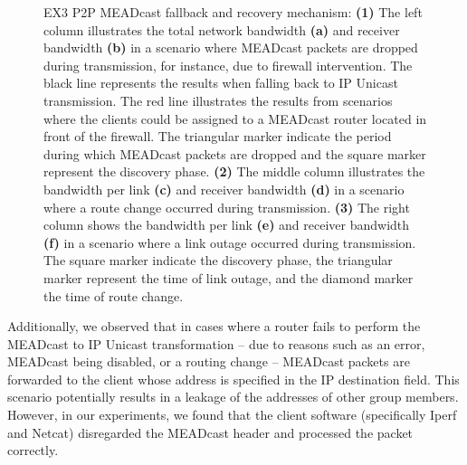 \begin{figure}
    \begin{center}
        
    \end{center}
    \caption[MEADcast fallback and recovery mechanism]{
        EX3 P2P MEADcast fallback and recovery mechanism:
        \textbf{(1)} The left column illustrates the total network bandwidth
            \textbf{(a)} and receiver bandwidth \textbf{(b)} in a scenario
            where MEADcast packets are dropped during transmission, for
            instance, due to firewall intervention.
        The black line represents the results when falling back to IP Unicast
            transmission.
        The red line illustrates the results from scenarios where the clients
            could be assigned to a MEADcast router located in front of the
            firewall.
        The triangular marker indicate the period during which MEADcast packets
            are dropped and the square marker represent the discovery phase.
        \textbf{(2)} The middle column illustrates the bandwidth per link
            \textbf{(c)} and receiver bandwidth \textbf{(d)} in a scenario
            where a route change occurred during transmission.
        \textbf{(3)} The right column  shows the bandwidth per link
            \textbf{(e)} and receiver bandwidth \textbf{(f)} in a scenario
            where a link outage occurred during transmission.
        The square marker indicate the discovery phase, the triangular marker
            represent the time of link outage, and the diamond marker the time 
            of route change.
        }
    \label{fig:dyn_net_env}
\end{figure}

Additionally, we observed that in cases where a router fails to perform the
    MEADcast to IP Unicast transformation -- due to reasons such as an error,
    MEADcast being disabled, or a routing change -- MEADcast packets are
    forwarded to the client whose address is specified in the IP destination
    field.
This scenario potentially results in a leakage of the addresses of other
    group members.
However, in our experiments, we found that the client software (specifically
    Iperf and Netcat) disregarded the MEADcast header and processed the packet
    correctly.

